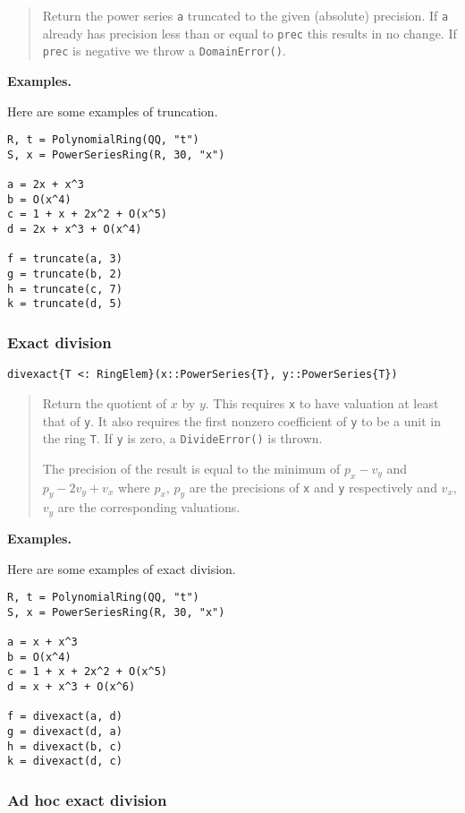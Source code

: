\documentclass[a4paper,10pt]{article}
\newcommand{\code}{\lstinline}
\newcommand{\desc}[1]{\vspace{-3mm}\begin{quote}#1\end{quote}}
\begin{document}
\desc{Return the power series \code{a} truncated to the given (absolute)
precision. If \code{a} already has precision less than or equal to \code{prec}
this results in no change. If \code{prec} is negative we throw a
\code{DomainError()}.}

\textbf{Examples.}

Here are some examples of truncation.

\begin{lstlisting}
R, t = PolynomialRing(QQ, "t")
S, x = PowerSeriesRing(R, 30, "x")

a = 2x + x^3
b = O(x^4)
c = 1 + x + 2x^2 + O(x^5)
d = 2x + x^3 + O(x^4)

f = truncate(a, 3)
g = truncate(b, 2)
h = truncate(c, 7)
k = truncate(d, 5)
\end{lstlisting}

\subsubsection{Exact division}

\begin{lstlisting}
divexact{T <: RingElem}(x::PowerSeries{T}, y::PowerSeries{T})
\end{lstlisting}

\desc{Return the quotient of $x$ by $y$. This requires \code{x} to have
valuation at least that of \code{y}. It also requires the first nonzero
coefficient of \code{y} to be a unit in the ring \code{T}. If \code{y}
is zero, a \code{DivideError()} is thrown. 

The precision of the result is equal to the minimum of $p_x - v_y$
and $p_y - 2v_y + v_x$ where $p_x$, $p_y$ are the precisions of \code{x} and
\code{y} respectively and $v_x$, $v_y$ are the corresponding valuations.}

\textbf{Examples.}

Here are some examples of exact division.

\begin{lstlisting}
R, t = PolynomialRing(QQ, "t")
S, x = PowerSeriesRing(R, 30, "x")

a = x + x^3
b = O(x^4)
c = 1 + x + 2x^2 + O(x^5)
d = x + x^3 + O(x^6)

f = divexact(a, d)
g = divexact(d, a)
h = divexact(b, c)
k = divexact(d, c)
\end{lstlisting}

\subsubsection{Ad hoc exact division}
\end{document}
